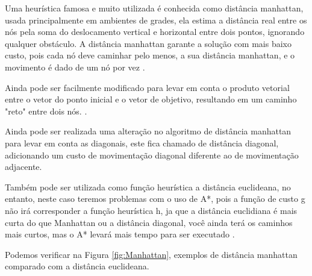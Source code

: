 Uma heurística famosa e muito utilizada é conhecida como distância manhattan, usada principalmente em ambientes de grades, ela estima a distância real entre os nós pela soma do deslocamento vertical e horizontal entre dois pontos, ignorando qualquer obstáculo.
A distância manhattan garante a solução com mais baixo custo, pois cada nó deve caminhar pelo menos, a sua distância manhattan, e o movimento é dado de um nó por vez \cite{Korf2000}.

Ainda pode ser facilmente modificado para levar em conta o produto vetorial entre o vetor do ponto inicial e o vetor de objetivo, resultando em um caminho "reto" entre dois nós. \cite{GameProgrammingHeuristics}.

Ainda pode ser realizada uma alteração no algoritmo de distância manhattan para levar em conta as diagonais, este fica chamado de distância diagonal, adicionando um custo de movimentação diagonal diferente ao de movimentação adjacente.

Também pode ser utilizada como função heurística a distância euclideana, no entanto, neste caso teremos problemas com o uso de A*, pois a função de custo g não irá corresponder a função heurística h, ja que a  distância euclidiana é mais curta do que Manhattan ou a distância diagonal, você ainda terá os caminhos mais curtos, mas o A* levará mais tempo para ser executado \cite{GameProgrammingHeuristics}.

Podemos verificar na Figura \ref{fig:Manhattan}, exemplos de distância manhattan comparado com a distância euclideana.

\begin{minipage}{\linewidth}
    \label{fig:Manhattan}
\end{minipage}

